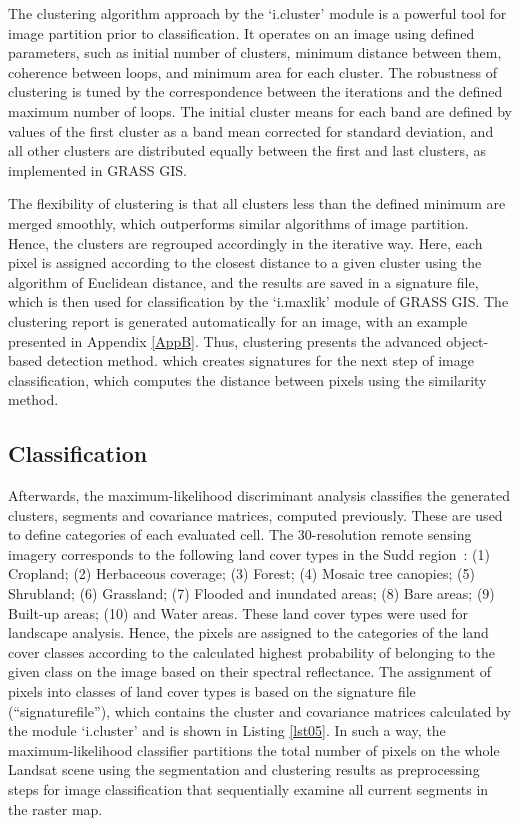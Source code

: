 \documentclass[analytics,article,accept,pdftex,moreauthors]{Definitions/mdpi}
\begin{document}
The clustering algorithm approach by the `i.cluster' module is a powerful tool for image partition prior to classification. It operates on an image using  defined parameters, such as initial number of clusters, minimum distance between them, coherence between loops, and minimum area for each cluster. The robustness of clustering is tuned by the correspondence between the iterations and the defined maximum number of loops. The initial cluster means for each band are defined by values of the first cluster as a band mean corrected for standard deviation, and all other clusters are distributed equally between the first and  last clusters, as implemented in GRASS GIS.  %

The flexibility of clustering is that all clusters less than the defined minimum are merged smoothly, which outperforms similar algorithms of image partition. Hence, the clusters are regrouped accordingly in the iterative way. Here, each pixel is assigned according to the closest distance to a given cluster using the algorithm of  Euclidean distance, and the results are saved in a signature file, which is then used for classification by the `i.maxlik' module of GRASS GIS. The clustering report  is generated automatically for an image, with an example presented in Appendix \ref{AppB}. %
Thus, clustering presents the advanced object-based detection method. which creates signatures for the next step of image classification, which computes the distance between  pixels using the similarity method. %

\subsection{Classification}
Afterwards, the maximum-likelihood discriminant analysis classifies the generated clusters, segments and covariance matrices, computed previously. These are used to define categories of each evaluated cell. {The 30-resolution remote sensing imagery corresponds to the following land cover types in the Sudd region}~\cite{FAO2023}: {(1) Cropland; (2) Herbaceous coverage; (3) Forest; (4) Mosaic tree canopies; (5) Shrubland; (6) Grassland; (7) Flooded and inundated areas; (8) Bare areas; (9) Built-up areas; (10) and Water areas. These land cover types were used for landscape analysis. }Hence, the pixels are assigned to the categories of the land cover classes according to the calculated highest probability of belonging to the given class on the image based on their spectral reflectance. The assignment of pixels into classes of land cover types is based on the signature file (``signaturefile''), which contains the cluster and covariance matrices calculated by the module `i.cluster' and is shown in Listing \ref{lst05}. In such a way, the maximum-likelihood classifier partitions the total number of pixels on the whole Landsat scene using the segmentation and clustering results as  preprocessing steps for image classification that sequentially examine all current segments in the raster map. 
\end{document}
